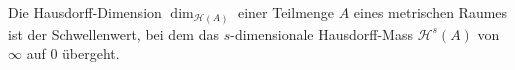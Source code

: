 \begin{definition}
    Die Hausdorff-Dimension $\dim_{\mathcal{H}(A)}$ einer Teilmenge $A$ eines metrischen Raumes ist der Schwellenwert,
     bei dem das $s$-dimensionale Hausdorff-Mass $\mathcal{H}^s(A)$ von $\infty$ auf $0$ übergeht. 
\end{definition}